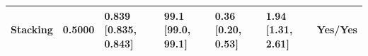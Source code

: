 \begin{table}[htbp]
{\begin{tabular}{lllllll}
Stacking & 0.5000 & \shortstack{{0.839} \\ {[0.835, 0.843]}} & \shortstack{{99.1} \\ {[99.0, 99.1]}} & \shortstack{{0.36} \\ {[0.20, 0.53]}} & \shortstack{{1.94} \\ {[1.31, 2.61]}} & Yes/Yes \\
\bottomrule
\end{tabular}
}
\end{table}
